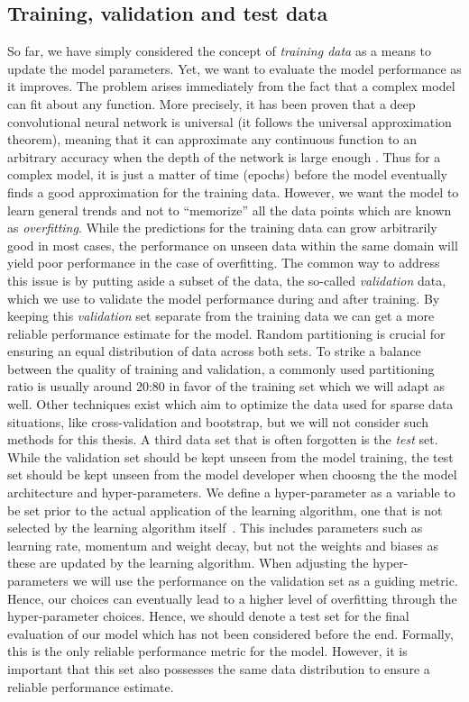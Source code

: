 \subsection{Training, validation and test data}
So far, we have simply considered the concept of \textit{training data} as a
means to update the model parameters. Yet, we want to evaluate the model
performance as it improves. The problem arises immediately from the fact that a
complex model can fit about any function. More precisely, it has been proven
that a deep convolutional neural network is universal (it follows the universal
approximation theorem), meaning that it can approximate any continuous function
to an arbitrary accuracy when the depth of the network is large enough
\cite{cybenko_approximation_1989}. Thus for a complex model, it is just a matter
of time (epochs) before the model eventually finds a good approximation for the
training data. However, we want the model to learn general trends and not to
``memorize'' all the data points which are known as \textit{overfitting}. While
the
predictions for the training data can grow arbitrarily good in most cases, the
performance on unseen data within the same domain will yield poor performance in the
case of overfitting. The common way to address this issue is by putting aside a
subset of the data, the so-called \textit{validation} data, which we use to
validate the model performance during and after training. By keeping this
\textit{validation} set separate from the training data we can get a more
reliable performance estimate for the model. Random partitioning is crucial for
ensuring an equal distribution of data across both sets. To strike a balance
between the quality of training and validation, a commonly used partitioning
ratio is usually around 20:80 in favor of the training set which we will adapt as well. Other techniques
exist which aim to optimize the data used for sparse data situations, like
cross-validation and bootstrap, but we will not consider such
methods for this thesis. A third data set that is often forgotten is the
\textit{test} set. While the validation set should be kept unseen from the model
training, the test set should be kept unseen from the model developer when choosng the the model architecture and hyper-parameters. We define a hyper-parameter
as a variable to be set prior to the actual application of the learning
algorithm, one that is not selected by the learning algorithm
itself~\cite{Bengio2012}. This includes parameters such as learning rate,
momentum and weight decay, but not the weights and biases as these are updated
by the learning algorithm. When adjusting the hyper-parameters we will use the
performance on the validation set as a guiding metric. Hence, our choices can
eventually lead to a higher level of overfitting through the hyper-parameter
choices. Hence, we should denote a test set for the final evaluation of our
model which has not been considered before the end. Formally, this is the only
reliable performance metric for the model. However, it is important that this set also possesses the same data distribution to ensure a reliable performance estimate.


